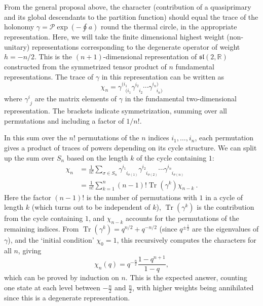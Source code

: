 \documentclass[12pt]{article}
\newcommand{\RR}{\mathbb{R}}
\newcommand{\lie}[1]{\mathfrak{#1}}
\DeclareMathOperator{\Tr}{Tr}
\begin{document}
From the general proposal above, the character (contribution of a quasiprimary and its global descendants to the partition function) should equal the trace of the holonomy $\gamma=\mathcal{P}\exp\left(-\oint a\right)$ round the thermal circle, in the appropriate representation. Here, we will take the finite dimensional highest weight (non-unitary) representations corresponding to the degenerate operator of weight $h=-n/2$. This is the  $(n+1)$-dimensional representation of $\lie{sl}(2,\RR)$ constructed from the symmetrized tensor product of $n$ fundamental representations. The trace of $\gamma$ in this representation can be written as
\begin{equation}
	\chi_n=\gamma^{(i_1}_{\phantom{i_1}(i_1}\gamma^{i_2}_{\phantom{i_2}i_2} \cdots \gamma^{i_n)}_{\phantom{i_n}i_n)}
\end{equation}
where $\gamma^i_{\phantom{i}j}$ are the matrix elements of $\gamma$ in the fundamental two-dimensional representation. The brackets indicate symmetrization, summing over all permutations and including a factor of $1/n!$.

In this sum over the $n!$ permutations of the $n$ indices $i_1,\ldots,i_n$, each permutation gives a product of traces of powers depending on its cycle structure. We can split up the sum over $S_n$ based on the length $k$ of the cycle containing $1$:
\begin{align}
	\chi_n &= \frac{1}{n!}\sum_{\sigma\in S_n}\gamma^{i_1}_{\phantom{i_1}i_{\sigma(1)}}\gamma^{i_2}_{\phantom{i_2}i_{\sigma(2)}} \cdots \gamma^{i_n}_{\phantom{i_n}i_{\sigma(n)}}\\
	&= \frac{1}{n!}\sum_{k=1}^n (n-1)!\Tr(\gamma^k) \chi_{n-k}~.
\end{align}
Here the factor $(n-1)!$ is the number of permutations with $1$ in a cycle of length $k$ (which turns out to be independent of $k$), $\Tr(\gamma^k)$ is the contribution from the cycle containing $1$, and $\chi_{n-k}$ accounts for the permutations of the remaining indices. From $\Tr(\gamma^k)=q^{n/2}+q^{-n/2}$ (since $q^{\pm\frac{1}{2}}$ are the eigenvalues of $\gamma$), and the `initial condition' $\chi_0=1$, this recursively computes the characters for all $n$, giving
\begin{equation}
	\chi_n(q) = q^{-\frac{n}{2}}\frac{1-q^{n+1}}{1-q},
\end{equation}
which can be proved by induction on $n$. This is the expected answer, counting one state at each level between $-\frac{n}{2}$ and $\frac{n}{2}$, with higher weights being annihilated since this is a degenerate representation.
\end{document}
